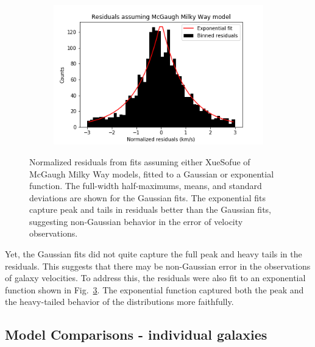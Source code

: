 \documentclass[reprint,%
 amsmath,amssymb,
 aps,
]{revtex4-1}
\begin{document}
\begin{figure}[h]
\begin{subfigure}[b]{0.475\textwidth}
         \label{fig:XueSofue residuals exponential fit}
     \end{subfigure}
     \begin{subfigure}[b]{0.475\textwidth}
         \centering
         \includegraphics[width=.8\linewidth]{figures/ResidualHist_ExpFit_v1_sinh_v2_cosh_sparc128_newnorm_McGaugh}
         \label{fig:McGaugh residuals exponential fit}
     \end{subfigure}
        \caption{Normalized residuals from fits assuming either XueSofue of McGaugh Milky Way models, fitted to a Gaussian or exponential function. The full-width half-maximums, means, and standard deviations are shown for the Gaussian fits. The exponential fits capture peak and tails in residuals better than the Gaussian fits, suggesting non-Gaussian behavior in the error of velocity observations.}
        \label{fig:residual graphs}
\end{figure}
Yet, the Gaussian fits did not quite capture the full peak and heavy tails in the residuals. This suggests that there may be non-Gaussian error in the observations of galaxy velocities. To address this, the residuals were also fit to an exponential function shown in Fig.~\ref{fig:residual graphs}. The exponential function captured both the peak and the heavy-tailed behavior of the distributions more faithfully.



 \subsection{ Model Comparisons - individual galaxies}
 \label{results:MtoL}
 
\end{document}
